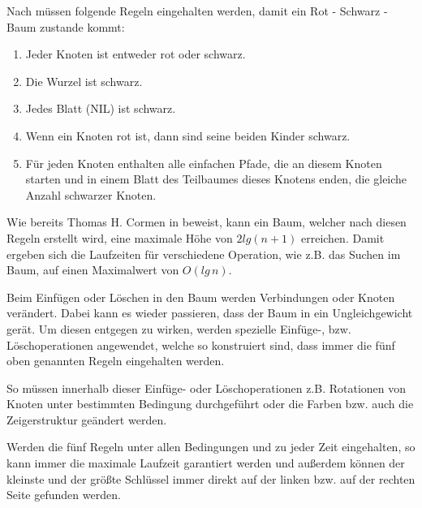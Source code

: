  
Nach \cite{tcormen} müssen folgende Regeln eingehalten werden, damit ein Rot - Schwarz - Baum zustande kommt:

\begin{enumerate}
	\item Jeder Knoten ist entweder rot oder schwarz.
	\item Die Wurzel ist schwarz.
	\item Jedes Blatt (NIL) ist schwarz.
	\item Wenn ein Knoten rot ist, dann sind seine beiden Kinder schwarz.
	\item Für jeden Knoten enthalten alle einfachen Pfade, die an diesem Knoten starten und in einem Blatt des Teilbaumes dieses Knotens enden, die gleiche Anzahl schwarzer Knoten. 
\end{enumerate}

Wie bereits Thomas H. Cormen in \cite{tcormen} beweist, kann ein Baum, welcher nach diesen Regeln erstellt wird, eine maximale Höhe von $2lg(n+1)$ erreichen. Damit ergeben sich die Laufzeiten für verschiedene Operation, wie z.B. das Suchen im Baum, auf einen Maximalwert von $O(lg\, n)$.

Beim Einfügen oder Löschen in den Baum werden Verbindungen oder Knoten verändert. Dabei kann es wieder passieren, dass der Baum in ein Ungleichgewicht gerät. 
Um diesen entgegen zu wirken, werden spezielle Einfüge-, bzw. Lösch\-operationen angewendet, welche so konstruiert sind, dass immer die fünf oben genannten Regeln eingehalten werden. 

So müssen innerhalb dieser Einfüge- oder Löschoperation\-en z.B. Rotationen von Knoten unter bestimmten Bedingung durchgeführt oder die Farben bzw. auch die Zeigerstruktur geändert werden.

Werden die fünf Regeln unter allen Bedingungen und zu jeder Zeit eingehalten, so kann immer die maximale Laufzeit garantiert werden und außerdem können der kleinste und der größte Schlüssel immer direkt auf der linken bzw. auf der rechten Seite gefunden werden.


